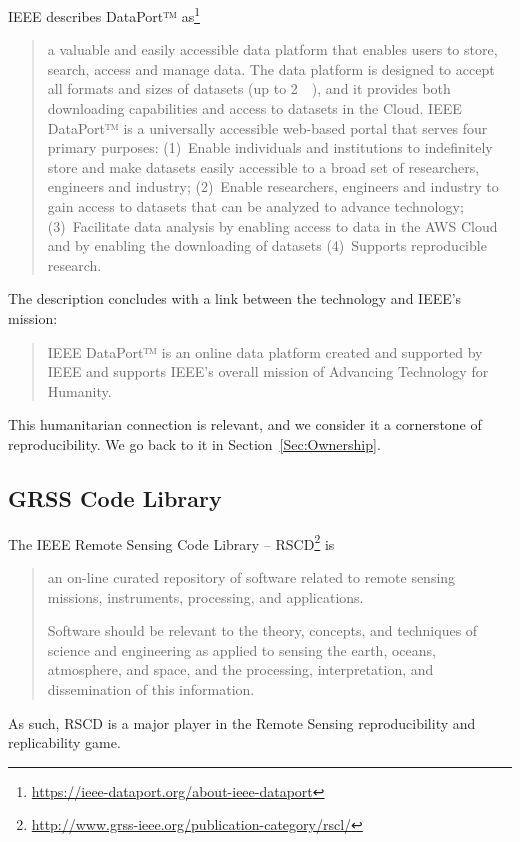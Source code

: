 \documentclass[journal,twoside]{IEEEtran}
\begin{document}
IEEE describes DataPort™ as\footnote{\url{https://ieee-dataport.org/about-ieee-dataport}} 
\begin{quote}
a valuable and easily accessible data platform that enables users to store, search, access and manage data.  
The data platform is designed to accept all formats and sizes of datasets (up to \SI{2}{\tera\byte}), and it provides both downloading capabilities and access to datasets in the Cloud.  
IEEE DataPort™ is a universally accessible web-based portal that serves four primary purposes: 
(1)~Enable individuals and institutions to indefinitely store and make datasets easily accessible to a broad set of researchers, engineers and industry;  
(2)~Enable researchers, engineers and industry to gain access to datasets that can be analyzed to advance technology;
(3)~Facilitate data analysis by enabling access to data in the AWS Cloud and by enabling the downloading of datasets
(4)~Supports reproducible research.
\end{quote}

The description concludes with a link between the technology and IEEE's mission:
\begin{quote}
IEEE DataPort™ is an online data platform created and supported by IEEE and supports IEEE’s overall mission of Advancing Technology for Humanity.  
\end{quote}
This humanitarian connection is relevant, and we consider it a cornerstone of reproducibility.
We go back to it in Section~\ref{Sec:Ownership}.


\subsection{GRSS Code Library}

The IEEE Remote Sensing Code Library -- RSCD\footnote{\url{http://www.grss-ieee.org/publication-category/rscl/}} is 
\begin{quote}
an on-line curated repository of software related to remote sensing missions, instruments, processing, and applications.

Software should be relevant to the theory, concepts, and techniques of science and engineering as applied to sensing the earth, oceans, atmosphere, and space, and the processing, interpretation, and dissemination of this information.
\end{quote}

As such, RSCD is a major player in the Remote Sensing reproducibility and replicability game.
\end{document}

